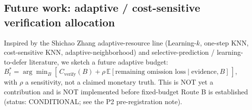 \documentclass[11pt,a4paper]{article}
\begin{document}
\subsection{Future work: adaptive / cost-sensitive verification allocation}
Inspired by the Shichao Zhang adaptive-resource line (Learning-$k$, one-step
KNN, cost-sensitive KNN, adaptive-neighborhood)
\cite{zhang_tkde2022_challenges,zhang_tkde2021_onestep,zhang_neurom2020_costsensitive,zhang_tkde2022_reachable}
and selective-prediction / learning-to-defer literature, we sketch a future
adaptive budget: $B_t^* = \arg\min_B [\,C_{\text{verify}}(B) + \rho\,\mathbb{E}[\text{remaining omission
loss}\mid \text{evidence}, B]\,]$, with $\rho$ a sensitivity, not a claimed
monetary truth. This is NOT yet a contribution and is NOT implemented before
fixed-budget Route B is established (status: CONDITIONAL; see the P2
pre-registration note).
\end{document}
